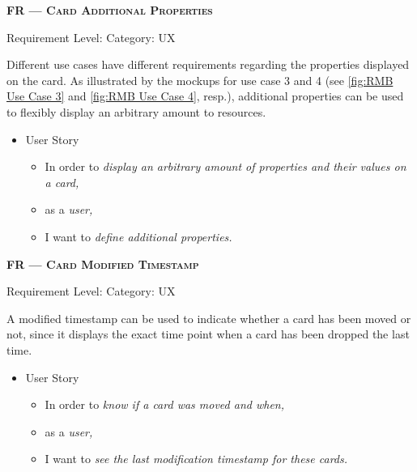 \centerline{\textbf{FR\textsubscript{} --- \textsc{Card Additional Properties}}}
\centerline{\small Requirement Level:  \quad{} Category: \acrshort*{UX}}

\noindent Different use cases have different requirements regarding the properties displayed on the card. As illustrated by the mockups for use case 3 and 4 (see \autoref{fig:RMB Use Case 3} and \autoref{fig:RMB Use Case 4}, resp.), additional properties can be used to flexibly display an arbitrary amount to resources.


\begin{itemize}[after=\vspace{1em}]
    \setlength\itemsep{-0.5em}
	\item[] User Story\\[-7.8mm]
	\begin{itemize}
    \setlength\itemsep{-0.5em}
        \item[] In order to \textit{display an arbitrary amount of properties and their values on a card,}
        \item[] as a \textit{user,}
        \item[] I want to \textit{define additional properties.}
    \end{itemize}
\end{itemize}

\newpage

\centerline{\textbf{FR\textsubscript{} --- \textsc{Card Modified Timestamp}}}
\centerline{\small Requirement Level:  \quad{} Category: \acrshort*{UX}}

\noindent A modified timestamp can be used to indicate whether a card has been moved or not, since it displays the exact time point when a card has been dropped the last time. 

\begin{itemize}[after=\vspace{1em}]
    \setlength\itemsep{-0.5em}
	\item[] User Story\\[-7.8mm]
	\begin{itemize}
    \setlength\itemsep{-0.5em}
        \item[] In order to \textit{know if a card was moved and when,}
        \item[] as a \textit{user,}
        \item[] I want to \textit{see the last modification timestamp for these cards.}
    \end{itemize}
\end{itemize}




